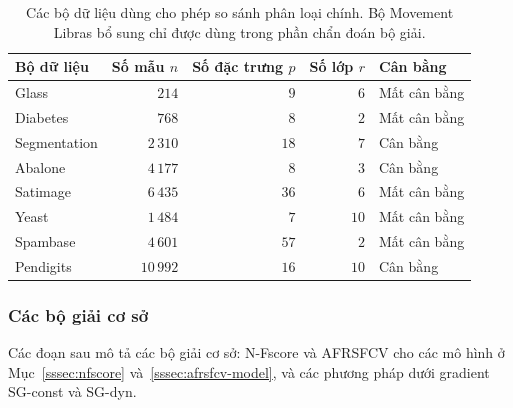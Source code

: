 \documentclass[]{interact}
\theoremstyle{plain}
\theoremstyle{definition}
\theoremstyle{remark}
\begin{document}
\begin{table}[htbp]
\centering
\caption{Các bộ dữ liệu dùng cho phép so sánh phân loại chính. Bộ Movement Libras bổ sung chỉ được dùng trong phần chẩn đoán bộ giải.}\label{tab:datasets}
\begin{tabular}{lrrrl}
\toprule
Bộ dữ liệu   & Số mẫu $n$ & Số đặc trưng $p$ & Số lớp $r$ & Cân bằng    \\
\midrule
Glass        & $214$       & $9$          & $6$         & Mất cân bằng \\
Diabetes     & $768$       & $8$          & $2$         & Mất cân bằng \\
Segmentation & $2\,310$    & $18$         & $7$         & Cân bằng   \\
Abalone      & $4\,177$    & $8$          & $3$         & Cân bằng   \\
Satimage     & $6\,435$    & $36$         & $6$         & Mất cân bằng \\
Yeast        & $1\,484$    & $7$          & $10$        & Mất cân bằng \\
Spambase     & $4\,601$    & $57$         & $2$         & Mất cân bằng \\
Pendigits    & $10\,992$   & $16$         & $10$        & Cân bằng   \\
\bottomrule
\end{tabular}
\end{table}
\subsubsection{Các bộ giải cơ sở}\label{sssec:baselines}
Các đoạn sau mô tả các bộ giải cơ sở: N-Fscore và AFRSFCV cho các mô hình ở Mục~\ref{sssec:nfscore} và~\ref{sssec:afrsfcv-model}, và các phương pháp dưới gradient SG-const và SG-dyn.
\end{document}
